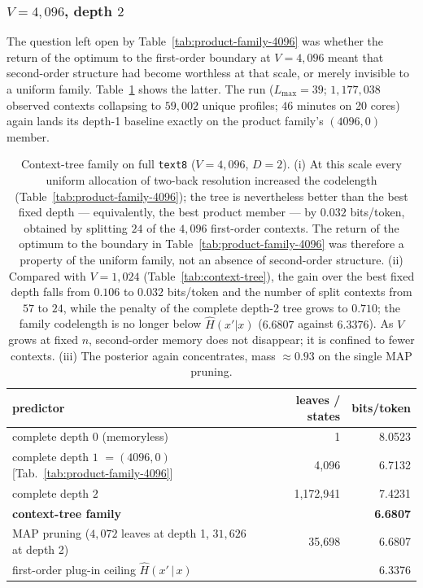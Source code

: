\documentclass[11pt]{article}
\begin{document}
\subsubsection*{$V=4{,}096$, depth $2$}
The question left open by Table~\ref{tab:product-family-4096} was
whether the return of the optimum to the first-order boundary at
$V=4{,}096$ meant that second-order structure had become worthless at
that scale, or merely invisible to a uniform family.
Table~\ref{tab:context-tree-4096} shows the latter.  The run
($L_{\max}=39$; $1{,}177{,}038$ observed contexts collapsing to
$59{,}002$ unique profiles; $46$ minutes on 20 cores) again lands its
depth-1 baseline exactly on the product family's $(4096,0)$ member.

\begin{table}[ht]
\centering
\begin{tabular}{lrr}
\toprule
predictor & leaves / states & bits/token \\
\midrule
complete depth $0$ (memoryless)            & 1            & 8.0523 \\
complete depth $1$ $=(4096,0)$
  [Tab.~\ref{tab:product-family-4096}]     & 4{,}096      & 6.7132 \\
complete depth $2$                         & 1{,}172{,}941 & 7.4231 \\
\textbf{context-tree family}               &              & \textbf{6.6807} \\
MAP pruning ($4{,}072$ leaves at depth 1,
  $31{,}626$ at depth 2)                   & 35{,}698     & 6.6807 \\
\midrule
first-order plug-in ceiling $\hat H(x'\,|\,x)$ &          & 6.3376 \\
\bottomrule
\end{tabular}
\caption{Context-tree family on full \texttt{text8} ($V=4{,}096$,
  $D=2$).  (i) At this scale every uniform allocation of two-back
  resolution increased the codelength
  (Table~\ref{tab:product-family-4096}); the tree is nevertheless
  better than the best fixed depth --- equivalently, the best product
  member --- by $0.032$ bits/token, obtained by splitting $24$ of the
  $4{,}096$ first-order contexts.  The return of the optimum to the
  boundary in Table~\ref{tab:product-family-4096} was therefore a
  property of the uniform family, not an absence of second-order
  structure.  (ii) Compared with $V=1{,}024$
  (Table~\ref{tab:context-tree}), the gain over the best fixed depth
  falls from $0.106$ to $0.032$ bits/token and the number of split
  contexts from $57$ to $24$, while the penalty of the complete
  depth-2 tree grows to $0.710$; the family codelength is no longer
  below $\hat H(x'|x)$ ($6.6807$ against $6.3376$).  As $V$ grows at
  fixed $n$, second-order memory does not disappear; it is confined to
  fewer contexts.  (iii) The posterior again concentrates, mass
  $\approx 0.93$ on the single MAP pruning.}
\label{tab:context-tree-4096}
\end{table}
\end{document}
